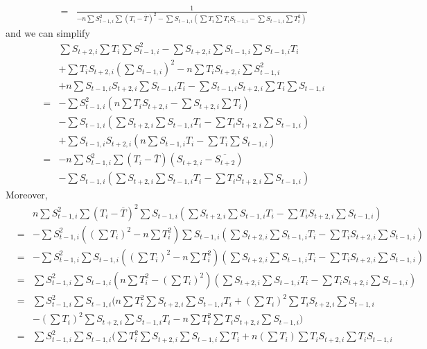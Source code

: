 \documentclass{article}
\begin{document}
\begin{itemize}
\begin{itemize}
\begin{eqnarray*}
        & = & \frac 1 {-n\sum S_{t-1,i}^2\sum (T_i - \overline T)^2  - \sum S_{t-1,i}(\sum T_i\sum T_iS_{t-1,i}
        - \sum S_{t-1,i}\sum T_i^2)}
      \end{eqnarray*}
      and we can simplify
       \begin{eqnarray*}
        && \sum S_{t+2,i}\sum T_i \sum S_{t-1,i}^2 - \sum S_{t+2,i}\sum S_{t-1,i}\sum S_{t-1,i}T_i\\
        &&+\sum T_iS_{t+2,i}(\sum S_{t-1,i})^2 - n\sum T_iS_{t+2,i}\sum S_{t-1,i}^2\\
        &&+n\sum S_{t-1,i}S_{t+2,i}\sum S_{t-1,i}T_i-\sum S_{t-1,i}S_{t+2,i}\sum T_i\sum S_{t-1,i}\\
        &=&- \sum S_{t-1,i}^2( n\sum T_iS_{t+2,i}-\sum S_{t+2,i}\sum T_i)  \\
        &&-\sum S_{t-1,i}( \sum S_{t+2,i}\sum S_{t-1,i}T_i -\sum T_iS_{t+2,i}\sum S_{t-1,i})\\
        &&+\sum S_{t-1,i}S_{t+2,i}(n\sum S_{t-1,i}T_i-\sum T_i\sum S_{t-1,i})\\
        & = &-n\sum S_{t-1,i}^2\sum (T_i - \overline T)(S_{t+2,i} - \overline{S_{t+2}})  \\
        &&-\sum S_{t-1,i}( \sum S_{t+2,i}\sum S_{t-1,i}T_i -\sum T_iS_{t+2,i}\sum S_{t-1,i})
      \end{eqnarray*}
    Moreover,
    \begin{eqnarray*}
        & &n\sum S_{t-1,i}^2\sum (T_i - \overline T)^2\sum S_{t-1,i}( \sum S_{t+2,i}\sum S_{t-1,i}T_i -\sum T_iS_{t+2,i}\sum S_{t-1,i})\\
        & = &-\sum S_{t-1,i}^2((\sum{T_i})^2-n\sum{T_i^2})\sum S_{t-1,i}( \sum S_{t+2,i}\sum S_{t-1,i}T_i -\sum T_iS_{t+2,i}\sum S_{t-1,i}) \\ 
        & = &-\sum S_{t-1,i}^2\sum S_{t-1,i}((\sum{T_i})^2-n\sum{T_i^2})( \sum S_{t+2,i}\sum S_{t-1,i}T_i -\sum T_iS_{t+2,i}\sum S_{t-1,i})\\
        & = & \sum S_{t-1,i}^2\sum S_{t-1,i}(n\sum{T_i^2} - (\sum{T_i})^2)( \sum S_{t+2,i}\sum S_{t-1,i}T_i -\sum T_iS_{t+2,i}\sum S_{t-1,i})\\
        & = &\sum S_{t-1,i}^2\sum S_{t-1,i}(n\sum T_i^2\sum S_{t+2,i}\sum S_{t-1,i}T_i + (\sum{T_i})^2\sum T_iS_{t+2,i}\sum S_{t-1,i} \\
        & &  - (\sum{T_i})^2\sum S_{t+2,i}\sum S_{t-1,i}T_i - n\sum{T_i^2}\sum T_iS_{t+2,i}\sum S_{t-1,i})\\ 
        & = &\sum S_{t-1,i}^2\sum S_{t-1,i}(\sum T_i^2\sum S_{t+2,i}\sum S_{t-1,i}\sum T_i + n(\sum{T_i})\sum T_iS_{t+2,i}\sum T_iS_{t-1,i} \\

\end{eqnarray*}
\end{itemize}
\end{itemize}
\end{document}
